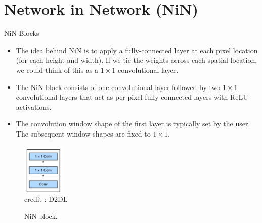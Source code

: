 \section{Network in Network (NiN)}


\begin{vbframe}{NiN Blocks}
  \begin{itemize}
    \item The idea behind NiN is to apply a fully-connected layer at each pixel location (for each height and width). If we tie the weights across each spatial location, we could think of this as a $1 \times 1$ convolutional layer.
    \item The NiN block consists of one convolutional layer followed by two $1 \times 1$  convolutional layers that act as per-pixel fully-connected layers with ReLU activations.
    \item The convolution window shape of the first layer is typically set by the user. The subsequent window shapes are fixed to $1 \times 1$.
  \end{itemize}
  \begin{figure}
  \centering
    \includegraphics[width=2cm]{plots/moderncnn/ninblock.png}
    \tiny{\\ credit : D2DL}
    \caption{NiN block.}
  \end{figure}

\end{vbframe}


